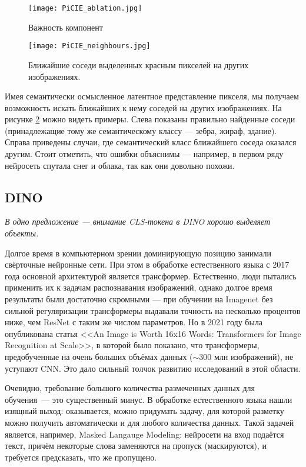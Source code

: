     \begin{figure}
        \centering
        \texttt{[image: PiCIE\_ablation.jpg]}
        \caption{Важность компонент \label{fig:picie_ablation}}
    \end{figure}

    \begin{figure}
        \centering
        \texttt{[image: PiCIE\_neighbours.jpg]}
        \caption{Ближайшие соседи выделенных красным пикселей на других изображениях. \label{fig:picie_neighbours}}
    \end{figure}

    Имея семантически осмысленное латентное представление пикселя, мы получаем возможность искать ближайших к нему соседей на других изображениях.
    На рисунке \ref{fig:picie_neighbours} можно видеть примеры. Слева показаны правильно найденные соседи (принадлежащие тому же семантическому классу --- зебра, жираф, здание).
    Справа приведены случаи, где семантический класс ближайшего соседа оказался другим.
    Стоит отметить, что ошибки объяснимы --- например, в первом ряду нейросеть спутала снег и облака, так как они довольно похожи.

    \FloatBarrier

\subsection{DINO}
    \textit{В одно предложение --- внимание CLS-токена в DINO хорошо выделяет объекты.}
    \bigskip

    Долгое время в компьютерном зрении доминирующую позицию занимали свёрточные нейронные сети.
    При этом в обработке естественного языка с 2017 года основной архитектурой является трансформер.
    Естественно, люди пытались применить их к задачам распознавания изображений, однако долгое время результаты были достаточно скромными ---
    при обучении на Imagenet без сильной регуляризации трансформеры выдавали точность на несколько процентов ниже, чем ResNet с таким же числом параметров. 
    Но в 2021 году была опубликована статья <<An Image is Worth 16x16 Words: Transformers for Image Recognition at Scale>>,
    в которой было показано, что трансформеры, предобученные на очень больших объёмах данных ($\sim 300$ млн изображений), не уступают CNN.
    Это дало сильный толчок развитию исследований в этой области.

    Очевидно, требование большого количества размеченных данных для обучения~--- это существенный минус.
    В обработке естественного языка нашли изящный выход: оказывается, можно придумать задачу, для которой разметку 
    можно получить автоматически и для любого количества данных. Такой задачей является, например, Masked Langauge Modeling:
    нейросети на вход подаётся текст, причём некоторые слова заменяются на пропуск (маскируются), и требуется предсказать, что же пропущено.
    
